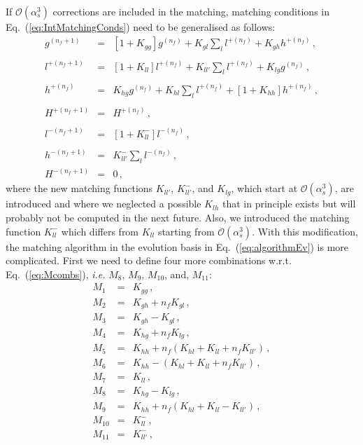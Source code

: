 \documentclass[10pt,a4paper]{article}
\begin{document}
If $\mathcal{O}(\alpha_s^3)$ corrections are included in the matching, matching
conditions in Eq.~(\ref{eq:IntMatchingConds}) need to be generalised as follows:
\begin{equation}
\begin{array}{rcl}
  \displaystyle g^{(n_f+1)}&=&\displaystyle
                               [1+K_{gg}]g^{(n_f)}+K_{gl}\sum_l
                               l^{+(n_f)} + K_{gh}h^{+(n_f)}\,,\\
  \\
  \displaystyle l^{+(n_f+1)}&=&\displaystyle [1+K_{ll}]l^{+(n_f)}+K_{ll'}\sum_l l^{+(n_f)}+K_{lg}g^{(n_f)}\,,\\
  \\
  \displaystyle h^{+(n_f)}&=&\displaystyle K_{hg}g^{(n_f)} + K_{hl}\sum_l
                                l^{+(n_f)}+[1+K_{hh}]h^{+(n_f)}\,,\\
  \\
  H^{+(n_f+1)} &=& H^{+(n_f)}\,,\\
\\
  \displaystyle l^{-(n_f+1)}&=&\displaystyle [1+K_{ll}^-]l^{-(n_f)}\,,\\
  \\
  \displaystyle h^{-(n_f+1)}&=&\displaystyle K_{ll'}^-\sum_l
                                l^{-(n_f)}\,,\\
  H^{-(n_f+1)} &=& 0\,,
\end{array}
\label{eq:IntMatchingCondsN3LO}
\end{equation}
where the new matching functions $K_{ll'}$, $K_{ll'}^-$, and $K_{lg}$,
which start at $\mathcal{O}(\alpha_s^3)$, are introduced and where we
neglected a possible $K_{lh}$ that in principle exists but will
probably not be computed in the next future. Also, we introduced the
matching function $K_{ll}^-$ which differs from $K_{ll}$ starting from
$\mathcal{O}(\alpha_s^3)$. With this modification, the matching
algorithm in the evolution basis in Eq.~(\ref{eq:algorithmEv}) is more
complicated. First we need to define four more combinations
w.r.t. Eq.~(\ref{eq:Mcombs}), \textit{i.e.} $M_8$, $M_9$, $M_{10}$,
and, $M_{11}$:
\begin{equation}
  \begin{array}{lcl}
  M_1 &=& K_{gg}\,,\\
  M_2 &=& K_{gh} + n_f K_{gl}\,,\\
  M_3 &=& K_{gh}-K_{gl}\,,\\
  M_4 &=& K_{hg}+n_f K_{lg}\,,\\
  M_5 &=& K_{hh}+n_f(K_{hl}+K_{ll}+n_f K_{ll'}) \,,\\
  M_6 &=& K_{hh}-(K_{hl}+K_{ll}+n_f K_{ll'})\,,\\
  M_7 &=& K_{ll}\,,\\
  M_8 &=& K_{hg} -  K_{lg}\,,\\
  M_9 &=& K_{hh}+n_f(K_{hl}+K_{ll}-K_{ll'})\,,\\
  M_{10} &=& K_{ll}^-\,,\\
  M_{11} &=& K_{ll'}^-\,,\\
  \end{array}
  \label{eq:McombsN3LO}
\end{equation}
\end{document}
